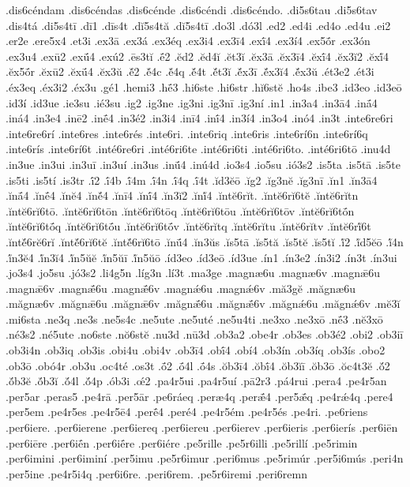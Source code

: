 {.dis6céndam
.dis6céndas
.dis6cénde
.dis6céndi
.dis6céndo.
.di5s6tau
.di5s6tav
.dis4tá
.di5s4tī
.dī1
.dīs4t
.dĭ5s4tă
.dĭ5s4tī
.do3l
.dó3l
.ed2
.ed4i
.ed4o
.ed4u
.ei2
.er2e
.ere5x4
.et3i
.ex3ā
.ex3á
.ex3éq
.ex3i4
.ex3ī4
.exī́4
.ex3í4
.ex5ṓr
.ex3ón
.ex3u4
.exū2
.exū́4
.exú2
.ēs3tĭ
.ḗ2
.ĕd2
.ĕd4ĭ
.ĕt3ĭ
.ĕx3ā
.ĕx3ī4
.ĕxī́4
.ĕx3ĭ2
.ĕxĭ́4
.ĕx5ṓr
.ĕxū2
.ĕxū́4
.ĕx3ŭ
.ĕ́2
.ĕ́4c
.ĕ́4q
.ĕ́4t
.ĕ́t3ĭ
.ĕ́x3ī
.ĕ́x3ĭ4
.ĕ́x3ŭ
.ét3e2
.ét3i
.éx3eq
.éx3i2
.éx3u
.gé1
.hemi3
.hḗ3
.hi6ste
.hi6str
.hĭ6stĕ
.ho4s
.ibe3
.id3eo
.id3eō
.id3í
.id3ue
.ie3su
.ié3su
.ig2
.ig3ne
.ig3ni
.ig3nī
.ig3ní
.in1
.in3a4
.in3ā4
.inā́4
.iná4
.in3e4
.inē2
.inḗ4
.in3é2
.in3i4
.inī4
.inī́4
.in3í4
.in3o4
.inó4
.in3t
.inte6re6ri
.inte6re6rí
.inte6res
.inte6rés
.inte6ri.
.inte6riq
.inte6ris
.inte6rí6n
.inte6rí6q
.inte6rís
.inte6rí6t
.inté6re6ri
.inté6ri6te
.inté6ri6ti
.inté6ri6to.
.inté6ri6tō
.inu4d
.in3ue
.in3ui
.in3uī
.in3uí
.in3us
.inū́4
.inú4d
.io3s4
.io5su
.ió3s2
.is5ta
.is5tā
.is5te
.is5ti
.is5tí
.is3tr
.ī́2
.ī́4b
.ī́4m
.ī́4n
.ī́4q
.ī́4t
.ĭd3ĕō
.ĭg2
.ĭg3nĕ
.ĭg3nī
.ĭn1
.ĭn3ā4
.ĭnā́4
.ĭnḗ4
.ĭnĕ4
.ĭnĕ́4
.ĭnī4
.ĭnī́4
.ĭn3ĭ2
.ĭnĭ́4
.ĭntĕ6rĭt.
.ĭntĕ6rĭ6tĕ
.ĭntĕ6rĭtn
.ĭntĕ6rĭ6tō.
.ĭntĕ6rĭ6tōn
.ĭntĕ6rĭ6tōq
.ĭntĕ6rĭ6tōu
.ĭntĕ6rĭ6tōv
.ĭntĕ6rĭ6tṓn
.ĭntĕ6rĭ6tṓq
.ĭntĕ6rĭ6tṓu
.ĭntĕ6rĭ6tṓv
.ĭntĕ6rĭtq
.ĭntĕ6rĭtu
.ĭntĕ6rĭtv
.ĭntĕ6rĭ́6t
.ĭntĕ́6rĕ6rĭ
.ĭntĕ́6rĭ6tĕ
.ĭntĕ́6rĭ6tō
.ĭnū́4
.ĭn3ŭs
.ĭs5tā
.ĭs5tă
.ĭs5tĕ
.ĭs5tĭ
.ĭ́2
.ĭ́d5ĕō
.ĭ́4n
.ĭ́n3ĕ4
.ĭ́n3ĭ4
.ĭ́n5ŭĕ
.ĭ́n5ŭī
.ĭ́n5ŭō
.íd3eo
.íd3eō
.íd3ue
.ín1
.ín3e2
.ín3i2
.ín3t
.ín3ui
.jo3s4
.jo5su
.jó3s2
.li4g5n
.líg3n
.lí3t
.ma3ge
.magnæ6u
.magnæ6v
.magnǣ6u
.magnǣ6v
.magnǣ́6u
.magnǣ́6v
.magnǽ6u
.magnǽ6v
.mă3gĕ
.măgnæ6u
.măgnæ6v
.măgnǣ6u
.măgnǣ6v
.măgnǣ́6u
.măgnǣ́6v
.măgnǽ6u
.măgnǽ6v
.mĕ3ĭ
.mi6sta
.ne3q
.ne3s
.ne5s4c
.ne5ute
.ne5uté
.ne5u4ti
.ne3xo
.ne3xō
.nḗ3
.nĕ3xō
.né3s2
.né5ute
.no6ste
.nŏ6stĕ
.nu3d
.nū3d
.ob3a2
.obe4r
.ob3es
.ob3é2
.obi2
.ob3iī
.ob3i4n
.ob3iq
.ob3is
.obi4u
.obi4v
.ob3ī4
.obī́4
.obí4
.ob3ín
.ob3íq
.ob3ís
.obo2
.ob3ō
.obó4r
.ob3u
.oc4té
.os3t
.ṓ2
.ṓ4l
.ṓ4s
.ŏb3ī4
.ŏbī́4
.ŏb3ĭī
.ŏb3ō
.ŏc4t3ĕ
.ŏ́2
.ŏ́b3ĕ
.ŏ́b3ĭ
.ŏ́4l
.ŏ́4p
.ób3i
.œ́2
.pa4r5ui
.pa4r5uí
.pā2r3
.pá4rui
.pera4
.pe4r5an
.per5ar
.peras5
.pe4rā
.per5ār
.pe6ráeq
.peræ4q
.perǣ́4
.per5ǣ́q
.pe4rǽ4q
.pere4
.per5em
.pe4r5es
.pe4r5ē4
.perḗ4
.peré4
.pe4r5ém
.pe4r5és
.pe4ri.
.pe6riens
.per6iere.
.per6ierene
.per6iereq
.per6iereu
.per6ierev
.per6ieris
.per6ierís
.per6iēn
.per6iēre
.per6iḗn
.per6iḗre
.per6iére
.pe5rille
.pe5r6illi
.pe5rillí
.pe5rimin
.per6imini
.per6iminí
.per5imu
.pe5r6imur
.peri6mus
.pe5rimúr
.per5i6mús
.peri4n
.per5ine
.pe4r5i4q
.per6i6re.
.peri6rem.
.pe5r6iremi
.peri6remn
}
